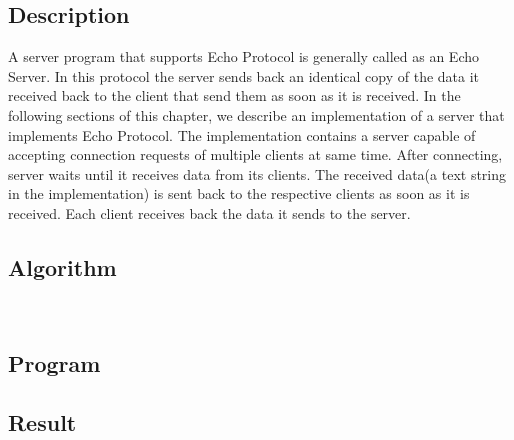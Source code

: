 \subsection{Description}
A server program that supports Echo Protocol is generally called as an Echo Server. In this protocol the server sends back an identical copy of the data it received back to the client that send them as soon as it is received. In the following sections of this chapter, we describe an implementation of a server that implements Echo Protocol. The implementation contains a server capable of accepting connection requests of multiple clients at same time. After connecting, server waits until it receives data from its clients. The received data(a text string in the implementation) is sent back to the respective clients as soon as it is received. Each client receives back the data it sends to the server.

\subsection{Algorithm}
\\

\subsection{Program}



\subsection{Result}\result
